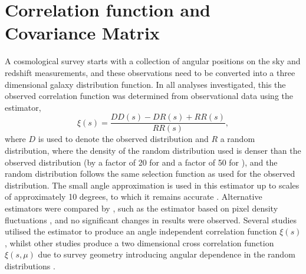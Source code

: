 \documentclass[titlesmallcaps, examinerscopy, copyrightpage]{uqthesis}
\begin{document}
\section{Correlation function and Covariance Matrix}

A cosmological survey starts with a collection of angular positions on the sky and redshift measurements, and these observations need to be converted into a three dimensional galaxy distribution function.
In all analyses investigated, this the observed correlation function was determined from observational data using the \citet{LandySzalay1993} estimator,
\begin{equation}
\xi(s) = \frac{DD(s) - DR(s) + RR(s)}{RR(s)},
\end{equation}
where $D$ is used to denote the observed distribution and $R$ a random distribution, where the density of the random distribution used is denser than the observed distribution (by a factor of 20 for \citet{Gaztanaga2009} and a factor of 50 for \citet{SanchezScoccola2012}), and the random distribution follows the same selection function as used for the observed distribution. The small angle approximation is used in this estimator up to scales of approximately 10 degrees, to which it remains accurate \citep{Szapudi2004, Matsubara2000Correlation}. Alternative estimators were compared by \citet{Gaztanaga2009}, such as the estimator based on pixel density fluctuations \citep{BarrigaGaztanaga2002}, and no significant changes in results were observed. Several studies utilised the \citet{LandySzalay1993} estimator to produce an angle independent correlation function $\xi(s)$ \citep{BlakeDavis2011, ChuangWang2012}, whilst other studies produce a two dimensional cross correlation function $\xi(s,\mu)$ due to survey geometry introducing angular dependence in the random distributions \citep{SanchezScoccola2012, SamushiaPercivalGuzzo2011, KazinSanchezBlanton2012}.\\
\end{document}
